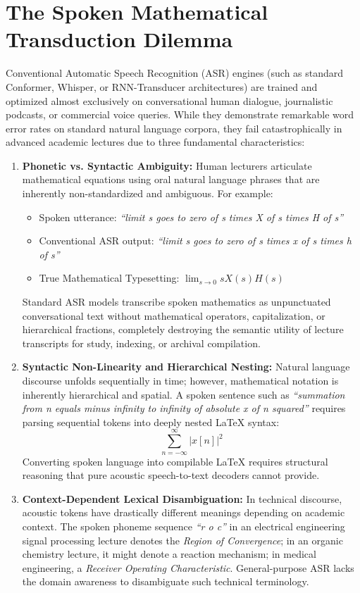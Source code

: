 \documentclass[11pt,a4paper,oneside]{report}
\begin{document}
\section{The Spoken Mathematical Transduction Dilemma}
Conventional Automatic Speech Recognition (ASR) engines (such as standard Conformer, Whisper, or RNN-Transducer architectures) are trained and optimized almost exclusively on conversational human dialogue, journalistic podcasts, or commercial voice queries. While they demonstrate remarkable word error rates on standard natural language corpora, they fail catastrophically in advanced academic lectures due to three fundamental characteristics:
\begin{enumerate}
    \item \textbf{Phonetic vs. Syntactic Ambiguity:} Human lecturers articulate mathematical equations using oral natural language phrases that are inherently non-standardized and ambiguous. For example:
    \begin{itemize}[noitemsep]
        \item Spoken utterance: \textit{``limit s goes to zero of s times X of s times H of s''}
        \item Conventional ASR output: \textit{``limit s goes to zero of s times x of s times h of s''}
        \item True Mathematical Typesetting: $\lim_{s \to 0} s X(s) H(s)$
    \end{itemize}
    Standard ASR models transcribe spoken mathematics as unpunctuated conversational text without mathematical operators, capitalization, or hierarchical fractions, completely destroying the semantic utility of lecture transcripts for study, indexing, or archival compilation.
    
    \item \textbf{Syntactic Non-Linearity and Hierarchical Nesting:} Natural language discourse unfolds sequentially in time; however, mathematical notation is inherently hierarchical and spatial. A spoken sentence such as \textit{``summation from n equals minus infinity to infinity of absolute x of n squared''} requires parsing sequential tokens into deeply nested LaTeX syntax:
    \begin{equation}
      \sum_{n=-\infty}^{\infty} |x[n]|^2
    \end{equation}
    Converting spoken language into compilable LaTeX requires structural reasoning that pure acoustic speech-to-text decoders cannot provide.
    
    \item \textbf{Context-Dependent Lexical Disambiguation:} In technical discourse, acoustic tokens have drastically different meanings depending on academic context. The spoken phoneme sequence \textit{``r o c''} in an electrical engineering signal processing lecture denotes the \textit{Region of Convergence}; in an organic chemistry lecture, it might denote a reaction mechanism; in medical engineering, a \textit{Receiver Operating Characteristic}. General-purpose ASR lacks the domain awareness to disambiguate such technical terminology.
\end{enumerate}
\end{document}
